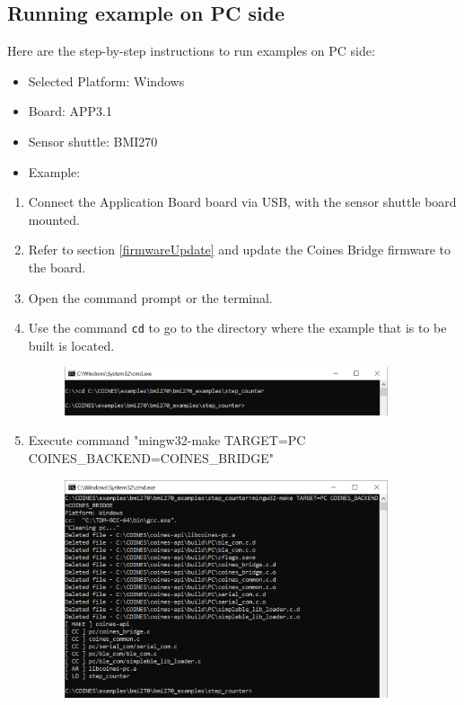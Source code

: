 \documentclass[11pt,headings=small]{scrartcl}
\begin{document}
\subsection{Running example on PC side}
Here are the step-by-step instructions to run examples on PC side:
\begin{itemize}
	\item Selected Platform: Windows
	\item Board: APP3.1
	\item Sensor shuttle: BMI270
	\item Example: 
\end{itemize}
\begin{enumerate}
	\item Connect the Application Board board via USB, with the sensor shuttle board mounted.
	\item Refer to section \ref{firmwareUpdate} and update the Coines Bridge firmware to the board.
	\item Open the command prompt or the terminal.
	\item Use the command \texttt{cd} to go to the directory where the example that is to be built is located.
	\begin{figure}[H]
		\begin{center}
			\includegraphics[width=0.9\textwidth]{coinesAPI_images/Pc_example_cd.png}
		\end{center}
	\end{figure}
	\item Execute command "mingw32-make TARGET=PC COINES\_BACKEND=COINES\_BRIDGE"
	\begin{figure}[H]
		\begin{center}
			\includegraphics[width=0.9\textwidth]{coinesAPI_images/Pc_example_compile.png}

\end{center}
\end{figure}
\end{enumerate}
\end{document}
